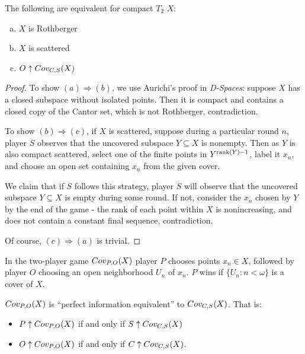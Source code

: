   \begin{theorem}
    The following are equivalent for compact $T_2$ $X$:
      \begin{enumerate}[(a)]
        \item $X$ is Rothberger
        \item $X$ is scattered
        \item $O\uparrow Cov_{C,S}(X)$
      \end{enumerate}
  \end{theorem}

  \begin{proof}
    To show $(a)\Rightarrow(b)$, we use Aurichi's proof in \textit{D-Spaces}: suppose $X$ has a closed subspace without isolated points. Then it is compact and contains a closed copy of the Cantor set, which is not Rothberger, contradiction.

    To show $(b)\Rightarrow(c)$, if $X$ is scattered, suppose during a particular round $n$, player $S$ observes that the uncovered subspace $Y \subseteq X$ is nonempty. Then as $Y$ is also compact scattered,  select one of the finite points in $Y^{\textrm{rank}(Y)-1}$, label it $x_n$, and choose an open set containing $x_n$ from the given cover.

    We claim that if $S$ follows this strategy, player $S$ will observe that the uncovered subspace $Y\subseteq X$ is empty during some round. If not, consider the $x_n$ chosen by $Y$ by the end of the game - the rank of each point within $X$ is nonincreasing, and does not contain a constant final sequence, contradiction.

    Of course, $(c)\Rightarrow(a)$ is trivial.
  \end{proof}

  \begin{definition}
    In the two-player game $Cov_{P,O}(X)$ player $P$ chooses points $x_n\in X$, followed by player $O$ choosing an open neighborhood $U_n$ of $x_n$. $P$ wins if $\{U_n:n<\omega\}$ is a cover of $X$.
  \end{definition}

  \begin{theorem} $Cov_{P,O}(X)$ is ``perfect information equivalent'' to $Cov_{C,S}(X)$. That is:

    \begin{itemize}
      \item $P\uparrow Cov_{P,O}(X)$ if and only if $S\uparrow Cov_{C,S}(X)$
      \item $O\uparrow Cov_{P,O}(X)$ if and only if $C\uparrow Cov_{C,S}(X)$.
    \end{itemize}
  \end{theorem}

